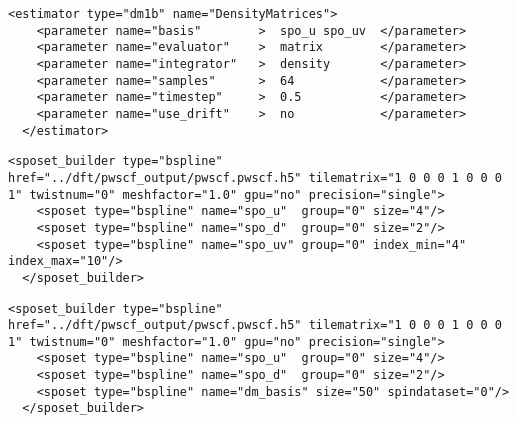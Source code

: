 \begin{lstlisting}[caption=One body density matrix with density sampling.]
  <estimator type="dm1b" name="DensityMatrices">
    <parameter name="basis"        >  spo_u spo_uv  </parameter>
    <parameter name="evaluator"    >  matrix        </parameter>
    <parameter name="integrator"   >  density       </parameter>
    <parameter name="samples"      >  64            </parameter>
    <parameter name="timestep"     >  0.5           </parameter>
    <parameter name="use_drift"    >  no            </parameter>
  </estimator>
\end{lstlisting}


\begin{lstlisting}[caption={Example sposet initialization for density matrix use.  Occupied and virtual orbital sets are created separately, then joined (\texttt{basis="spo\_u spo\_uv"}).}]
  <sposet_builder type="bspline" href="../dft/pwscf_output/pwscf.pwscf.h5" tilematrix="1 0 0 0 1 0 0 0 1" twistnum="0" meshfactor="1.0" gpu="no" precision="single">
    <sposet type="bspline" name="spo_u"  group="0" size="4"/>
    <sposet type="bspline" name="spo_d"  group="0" size="2"/>
    <sposet type="bspline" name="spo_uv" group="0" index_min="4" index_max="10"/>
  </sposet_builder>
\end{lstlisting}


\begin{lstlisting}[caption={Example sposet initialization for density matrix use.  Density matrix orbital basis created separately (\texttt{basis="dm\_basis"}).}]
  <sposet_builder type="bspline" href="../dft/pwscf_output/pwscf.pwscf.h5" tilematrix="1 0 0 0 1 0 0 0 1" twistnum="0" meshfactor="1.0" gpu="no" precision="single">
    <sposet type="bspline" name="spo_u"  group="0" size="4"/>
    <sposet type="bspline" name="spo_d"  group="0" size="2"/>
    <sposet type="bspline" name="dm_basis" size="50" spindataset="0"/>
  </sposet_builder>
\end{lstlisting}


